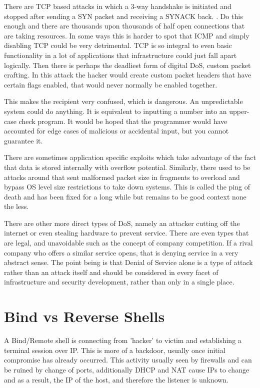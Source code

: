 There are TCP based attacks in which a 3-way handshake is initiated and stopped after sending a SYN packet and receiving a SYNACK back. \citep{DoSMit}. 
Do this enough and there are thousands upon thousands of half open connections that are taking resources. In some ways this is harder to spot that ICMP and simply disabling TCP could be very detrimental. TCP is so integral to even basic functionality in a lot of applications that infrastructure could just fall apart logically. \citep{DoSExplained}
Then there is perhaps the deadliest form of digital DoS, custom packet crafting. In this attack the hacker would create custom packet headers that have certain flags enabled, that would never normally be enabled together. 

This makes the recipient very confused, which is dangerous. An unpredictable system could do anything. It is equivalent to inputting a number into an upper-case check program. 
It would be hoped that the programmer would have accounted for edge cases of malicious or accidental input, but you cannot guarantee it. 

There are sometimes application specific exploits which take advantage of the fact that data is stored internally with overflow potential. Similarly, there used to be attacks around that sent malformed packet size in fragments to overload and bypass OS level size restrictions to take down systems. 
This is called the ping of death and has been fixed for a long while but remains to be good context none the less. \citep{ICMPFloodDetPrev}

There are other more direct types of DoS, namely an attacker cutting off the internet or even stealing hardware to prevent service. There are even types that are legal, and unavoidable such as the concept of company competition. If a rival company who offers a similar service opens, that is denying service in a very abstract sense.
The point being is that Denial of Service alone is a type of attack rather than an attack itself and should be considered in every facet of infrastructure and security development, rather than only in a single place.
\citep{AssignmentDOSPaper}


\section{Bind vs Reverse Shells}
A Bind/Remote shell is connecting from 'hacker' to victim and establishing a terminal session over IP. This is more of a backdoor, usually once initial compromise has already occurred. 
This activity usually seen by firewalls and can be ruined by change of ports, additionally DHCP and NAT cause IPs to change and as a result, the IP of the host, and therefore the listener is unknown.

